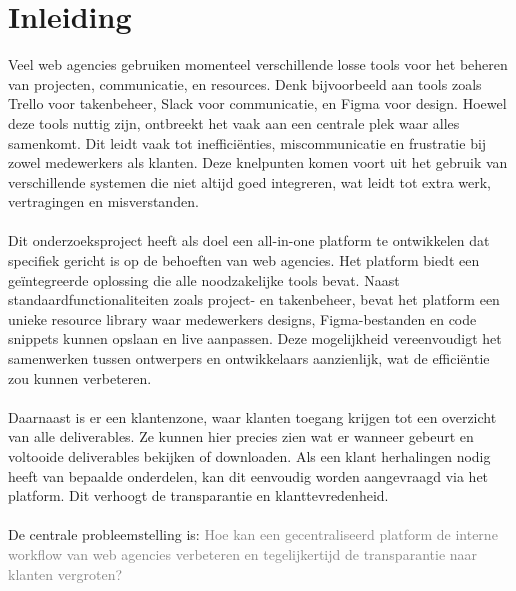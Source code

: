 


% 

\section{Inleiding}%
\label{sec:inleiding}

Veel web agencies gebruiken momenteel verschillende losse tools voor het beheren van projecten, communicatie, en resources. Denk bijvoorbeeld aan tools zoals Trello voor takenbeheer, Slack voor communicatie, en Figma voor design. Hoewel deze tools nuttig zijn, ontbreekt het vaak aan een centrale plek waar alles samenkomt. Dit leidt vaak tot inefficiënties, miscommunicatie en frustratie bij zowel medewerkers als klanten. Deze knelpunten komen voort uit het gebruik van verschillende systemen die niet altijd goed integreren, wat leidt tot extra werk, vertragingen en misverstanden.
\\
\\
Dit onderzoeksproject heeft als doel een all-in-one platform te ontwikkelen dat specifiek gericht is op de behoeften van web agencies. Het platform biedt een geïntegreerde oplossing die alle noodzakelijke tools bevat. Naast standaardfunctionaliteiten zoals project- en takenbeheer, bevat het platform een unieke resource library waar medewerkers designs, Figma-bestanden en code snippets kunnen opslaan en live aanpassen. Deze mogelijkheid vereenvoudigt het samenwerken tussen ontwerpers en ontwikkelaars aanzienlijk, wat de efficiëntie zou kunnen verbeteren.
\\
\\
Daarnaast is er een klantenzone, waar klanten toegang krijgen tot een overzicht van alle deliverables. Ze kunnen hier precies zien wat er wanneer gebeurt en voltooide deliverables bekijken of downloaden. Als een klant herhalingen nodig heeft van bepaalde onderdelen, kan dit eenvoudig worden aangevraagd via het platform. Dit verhoogt de transparantie en klanttevredenheid.
\\
\\
De centrale probleemstelling is: \textcolor{gray}{Hoe kan een gecentraliseerd platform de interne workflow van web agencies verbeteren en tegelijkertijd de transparantie naar klanten vergroten?}



